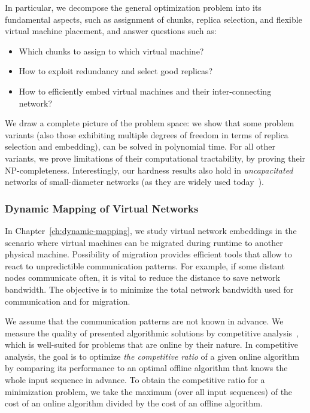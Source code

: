 In particular, we decompose the general optimization problem into its fundamental aspects, such as
assignment of chunks, replica selection, and flexible virtual machine
placement, and answer questions such as:
\begin{itemize}
\item Which chunks to assign to which virtual machine?

\item How to exploit redundancy and select good replicas?

\item How to efficiently embed virtual machines and their inter-connecting network?

\end{itemize}

We draw a complete picture of the problem space: we show that
some problem variants (also those exhibiting multiple degrees of freedom in terms of
replica selection and embedding),
can be solved in polynomial time. For all other variants, we prove limitations of their
computational tractability, by proving their NP-completeness. Interestingly,
our hardness results also hold in \emph{uncapacitated}
networks of small-diameter networks (as they are
widely used today~\cite{fattree}).


\subsubsection{Dynamic Mapping of Virtual Networks}
\label{sec:contributions-dynamic-mapping}

In Chapter~\ref{ch:dynamic-mapping}, we study virtual network embeddings in the scenario where virtual machines can be migrated during runtime to another physical machine.
Possibility of migration provides efficient tools that allow to react to unpredictible communication patterns.
For example, if some distant nodes communicate often, it is vital to reduce the distance to save network bandwidth.
The objective is to minimize the total network bandwidth used for communication and for migration.

We assume that the communication patterns are not known in advance.
We measure the quality of presented algorithmic solutions by competitive analysis~\cite{borodin-book}, which is well-suited for problems that are online by their nature.
In competitive analysis, the goal is to optimize \emph{the competitive ratio} of a given online algorithm by comparing its performance to an optimal offline algorithm that knows the whole input sequence in advance.
To obtain the competitive ratio for a minimization problem, we take the maximum (over all input sequences) of the cost of an online algorithm divided by the cost of an offline algorithm.


